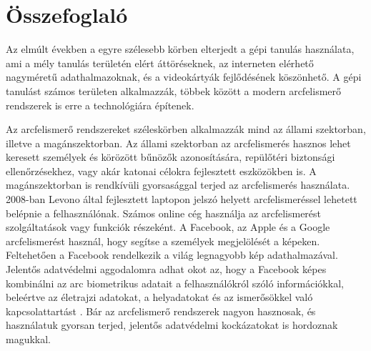 \section{Összefoglaló}




Az elmúlt években a egyre szélesebb körben elterjedt a gépi tanulás használata, ami a mély tanulás területén elért áttöréseknek, az interneten elérhető nagyméretű adathalmazoknak, és a videokártyák fejlődésének köszönhető. A gépi tanulást számos területen alkalmazzák, többek között a modern arcfelismerő rendszerek is erre a technológiára építenek. 

Az arcfelismerő rendszereket széleskörben alkalmazzák mind az állami szektorban, illetve a magánszektorban. Az állami szektorban az arcfelismerés hasznos lehet keresett személyek és körözött bűnözők azonosítására, repülőtéri biztonsági ellenőrzésekhez, vagy akár katonai célokra fejlesztett eszközökben is. A magánszektorban is rendkívüli gyorsasággal terjed az arcfelismerés használata. 2008-ban Levono által fejlesztett laptopon jelszó helyett arcfelismeréssel lehetett belépnie a felhasználónak. Számos online cég használja az arcfelismerést szolgáltatások vagy funkciók részeként. A Facebook, az Apple és a Google arcfelismerést használ, hogy segítse a személyek megjelölését a képeken. Feltehetően a Facebook rendelkezik a világ legnagyobb kép adathalmazával. Jelentős adatvédelmi aggodalomra adhat okot az, hogy a Facebook képes kombinálni az arc biometrikus adatait a felhasználókról szóló információkkal, beleértve az életrajzi adatokat, a helyadatokat és az ismerősökkel való kapcsolattartást \cite{public_private_fr}. Bár az arcfelismerő rendszerek nagyon hasznosak, és használatuk gyorsan terjed, jelentős adatvédelmi kockázatokat is hordoznak magukkal. 

